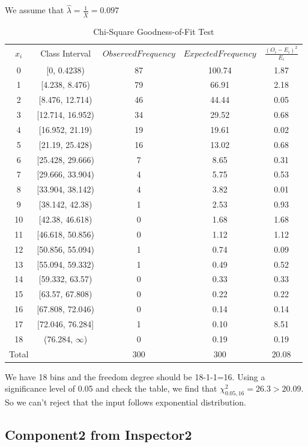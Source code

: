 \documentclass{article}
\begin{document}
We assume that $\hat{\lambda}=\frac{1}{\bar{X}}=0.097$
\begin{table}[htp]
\caption{Chi-Square Goodness-of-Fit Test}
\begin{center}
\begin{tabular}{ccccc}
\hline
$x_i$ & Class Interval & $Observed Frequency$ & $Expected Frequency$ & $\frac{(O_i-E_i)^2}{E_i}$\\
0& [0, 0.4238)&87&100.74&1.87\\
1& [4.238, 8.476)&79&66.91&2.18\\
2&[8.476, 12.714)&46&44.44&0.05\\
3& [12.714, 16.952)&34&29.52&0.68\\
4&[16.952, 21.19)&19&19.61&0.02\\
5& [21.19, 25.428)&16&13.02&0.68\\
6& [25.428, 29.666)&7&8.65&0.31\\
7& [29.666, 33.904)&4&5.75&0.53\\
8& [33.904, 38.142)&4&3.82&0.01\\
9& [38.142, 42.38)&1&2.53&0.93\\
10&[42.38, 46.618)&0&1.68&1.68\\
11&[46.618, 50.856)&0&1.12&1.12\\
12& [50.856, 55.094)&1&0.74&0.09\\
13& [55.094, 59.332)&1&0.49&0.52\\
14& [59.332, 63.57)&0&0.33&0.33\\
15& [63.57, 67.808)&0&0.22&0.22\\
16& [67.808, 72.046)&0&0.14&0.14\\
17& [72.046, 76.284]&1&0.10&8.51\\
18& (76.284, $\infty$)&0&0.19&0.19\\
\hline
Total& &300&300&20.08\\

\hline

\end{tabular}
\end{center}
\label{default}
\end{table}%

We have 18 bins and the freedom degree should be 18-1-1=16. Using a significance level of 0.05 and check the table, we find that $\chi^2_{0.05, 16}=26.3 > 20.09$. So we can't reject that the input follows exponential distribution.

\subsection{Component2 from Inspector2}
\end{document}
